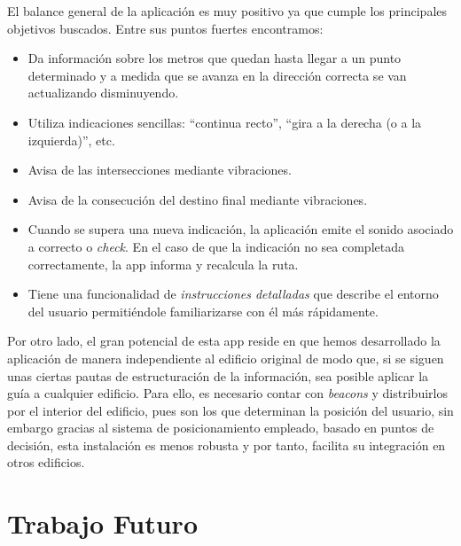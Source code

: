 El balance general de la aplicación es muy positivo ya que cumple los principales objetivos buscados. Entre sus puntos fuertes encontramos:
\begin{itemize}
	\item Da información sobre los metros que quedan hasta llegar a un punto determinado y a medida que se avanza en la dirección correcta se van actualizando disminuyendo.
	\item Utiliza indicaciones sencillas: ``continua recto'', ``gira a la derecha (o a la izquierda)'', etc.
	\item Avisa de las intersecciones mediante vibraciones.
	\item Avisa de la consecución del destino final mediante vibraciones.
	\item Cuando se supera una nueva indicación, la aplicación emite el sonido asociado a correcto o \textit{check}. En el caso de que la indicación no sea completada correctamente, la app informa y recalcula la ruta.
	\item Tiene una funcionalidad de \textit{instrucciones detalladas} que describe el entorno del usuario permitiéndole familiarizarse con él más rápidamente.
\end{itemize}

Por otro lado, el gran potencial de esta app reside en que hemos desarrollado la aplicación de manera independiente al edificio original de modo que, si se siguen unas ciertas pautas de estructuración de la información, sea posible aplicar la guía a cualquier edificio. Para ello, es necesario contar con \textit{beacons} y distribuirlos por el interior del edificio, pues son los que determinan la posición del usuario, sin embargo gracias al sistema de posicionamiento empleado, basado en puntos de decisión, esta instalación es menos robusta y por tanto, facilita su integración en otros edificios. 

\section{Trabajo Futuro}
\label{sec:trabajoFuturo}


